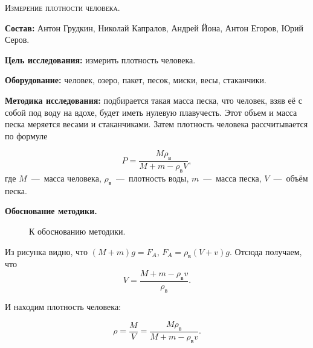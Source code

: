 \begin{center}
  \textsc{Измерение плотности человека. }
\end{center}

\textbf{Состав:} Антон Грудкин, Николай Капралов, Андрей Йона, Антон
Егоров, Юрий Серов.

\textbf{Цель исследования:} измерить плотность человека. 

\textbf{Оборудование:} человек, озеро, пакет, песок, миски, весы, стаканчики.

\textbf{Методика исследования:} подбирается такая масса песка, что
человек, взяв её с собой под воду на вдохе, будет иметь нулевую
плавучесть. Этот объем и масса песка меряется весами и
стаканчиками. Затем плотность человека рассчитывается по формуле

\begin{equation}
  \label{eq:bz09_01}
  P = \frac{M \rho_{\text{в}}}{M + m - \rho_{\text{в}} V},
\end{equation}
где $M$~---~масса человека, $\rho_{\text{в}}$~---~плотность воды,
$m$~---~масса песка, $V$~---~объём песка. 

\begin{center}
  \textbf{Обоснование методики.}  
\end{center}

\begin{figure}[ht]
  \centering
  \caption{К обоснованию методики.}
  \label{fig:bz09_density}
\end{figure}

Из рисунка видно, что $(M+m)g=F_A$, $F_A = \rho_{\text{в}} (V+v)
g$. Отсюда получаем, что
\begin{equation}
  \label{eq:bz09_1}
  V= \frac{M+m-\rho_{\text{в}} v} {\rho_{\text{в}}}.
\end{equation}

И находим плотность человека: 

\begin{equation}
  \label{eq:bz09_2}
  \rho = \frac{M}{V} = \frac{M \rho_{\text{в}}} {M+m-\rho_{\text{в}} v}.
\end{equation}

